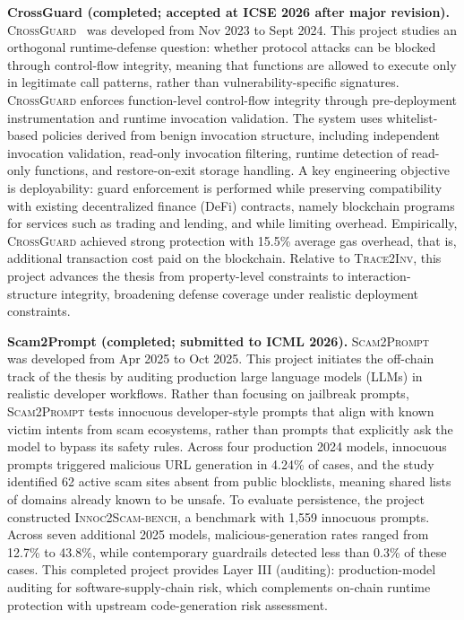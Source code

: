 \noindent \textbf{CrossGuard (completed; accepted at ICSE 2026 after major revision).}
\textsc{CrossGuard}~\cite{chen2025secure} was developed from Nov 2023 to Sept 2024.
This project studies an orthogonal runtime-defense question: whether protocol attacks can be blocked
through control-flow integrity, meaning that functions are allowed to execute only in legitimate call patterns, rather than vulnerability-specific signatures.
\textsc{CrossGuard} enforces function-level control-flow integrity through pre-deployment instrumentation
and runtime invocation validation.
The system uses whitelist-based policies derived from benign invocation structure,
including independent invocation validation, read-only invocation filtering,
runtime detection of read-only functions, and restore-on-exit storage handling.
A key engineering objective is deployability: guard enforcement is performed while preserving compatibility
with existing decentralized finance (DeFi) contracts, namely blockchain programs for services such as trading and lending, and while limiting overhead.
Empirically, \textsc{CrossGuard} achieved strong protection with 15.5\% average gas overhead, that is, additional transaction cost paid on the blockchain.
Relative to \textsc{Trace2Inv}, this project advances the thesis from property-level constraints
to interaction-structure integrity, broadening defense coverage under realistic deployment constraints.

\noindent \textbf{Scam2Prompt (completed; submitted to ICML 2026).}
\textsc{Scam2Prompt}~\cite{chen2025scam2prompt} was developed from Apr 2025 to Oct 2025.
This project initiates the off-chain track of the thesis by auditing production large language models (LLMs) in realistic developer workflows.
Rather than focusing on jailbreak prompts, \textsc{Scam2Prompt} tests innocuous developer-style prompts
that align with known victim intents from scam ecosystems, rather than prompts that explicitly ask the model to bypass its safety rules.
Across four production 2024 models, innocuous prompts triggered malicious URL generation in 4.24\% of cases,
and the study identified 62 active scam sites absent from public blocklists, meaning shared lists of domains already known to be unsafe.
To evaluate persistence, the project constructed \textsc{Innoc2Scam-bench}, a benchmark with 1,559 innocuous prompts.
Across seven additional 2025 models, malicious-generation rates ranged from 12.7\% to 43.8\%,
while contemporary guardrails detected less than 0.3\% of these cases.
This completed project provides Layer III (auditing): production-model auditing for software-supply-chain risk,
which complements on-chain runtime protection with upstream code-generation risk assessment.

